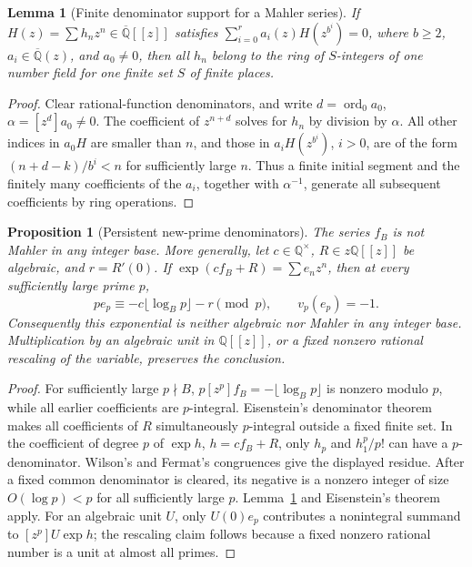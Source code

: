 \documentclass[11pt,a4paper]{article}
\newcommand{\Q}{\mathbb Q}
\newcommand{\Qbar}{\overline{\mathbb Q}}
\newtheorem{proposition}[theorem]{Proposition}
\newtheorem{lemma}[theorem]{Lemma}
\theoremstyle{definition}
\theoremstyle{remark}
\numberwithin{equation}{section}
\begin{document}
\begin{lemma}[Finite denominator support for a Mahler series]
\label{ar:mahlerfinite}
If $H(z)=\sum h_nz^n\in\Qbar[[z]]$ satisfies
$\sum_{i=0}^r a_i(z)H(z^{b^i})=0$, where $b\ge2$, $a_i\in\Qbar(z)$,
and $a_0\ne0$, then all $h_n$ belong to the ring of $S$-integers of one
number field for one finite set $S$ of finite places.
\end{lemma}
\begin{proof}
Clear rational-function denominators, and write
$d=\operatorname{ord}_0a_0$, $\alpha=[z^d]a_0\ne0$.  The coefficient of
$z^{n+d}$ solves for $h_n$ by division by $\alpha$.  All other indices in
$a_0H$ are smaller than $n$, and those in $a_iH(z^{b^i})$, $i>0$, are of
the form $(n+d-k)/b^i<n$ for sufficiently large $n$.  Thus a finite initial
segment and the finitely many coefficients of the $a_i$, together with
$\alpha^{-1}$, generate all subsequent coefficients by ring operations.
\end{proof}

\begin{proposition}[Persistent new-prime denominators]
\label{ar:vaccaprime}
The series $f_B$ is not Mahler in any integer base.  More generally, let
$c\in\Q^\times$, $R\in z\Q[[z]]$ be algebraic, and $r=R'(0)$.  If
$\exp(cf_B+R)=\sum e_nz^n$, then at every sufficiently large prime $p$,
\[
 pe_p\equiv-c\lfloor\log_Bp\rfloor-r\pmod p,
 \qquad v_p(e_p)=-1.
\]
Consequently this exponential is neither algebraic nor Mahler in any
integer base.  Multiplication by an algebraic unit in $\Q[[z]]$, or a
fixed nonzero rational rescaling of the variable, preserves the conclusion.
\end{proposition}
\begin{proof}
For sufficiently large $p\nmid B$, $p[z^p]f_B=-\lfloor\log_Bp\rfloor$
is nonzero modulo $p$, while all earlier coefficients are $p$-integral.
Eisenstein's denominator theorem makes all coefficients of $R$ simultaneously
$p$-integral outside a fixed finite set.  In the coefficient of degree $p$
of $\exp h$, $h=cf_B+R$, only $h_p$ and $h_1^p/p!$ can have a $p$-denominator.
Wilson's and Fermat's congruences give the displayed residue.  After a fixed
common denominator is cleared, its negative is a nonzero integer of size
$O(\log p)<p$ for all sufficiently large $p$.  Lemma~\ref{ar:mahlerfinite}
and Eisenstein's theorem apply.  For an algebraic unit $U$, only
$U(0)e_p$ contributes a nonintegral summand to $[z^p]U\exp h$; the rescaling
claim follows because a fixed nonzero rational number is a unit at almost
all primes.
\end{proof}
\end{document}
